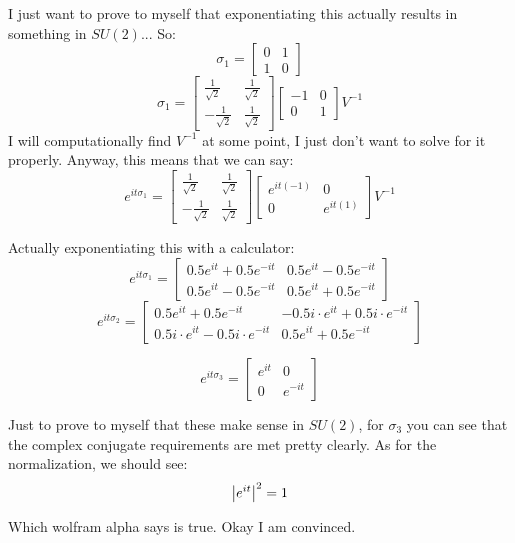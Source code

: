 \documentclass{article}
\begin{document}
I just want to prove to myself that exponentiating this actually results in something in $SU(2)$... So:
\[ \sigma_1 = \begin{bmatrix} 0 & 1 \\ 1 & 0 \end{bmatrix}  \]
\[ \sigma_1 = \begin{bmatrix}
    \frac{1}{\sqrt{2}} & \frac{1}{\sqrt{2}} \\ 
    -\frac{1}{\sqrt{2}} & \frac{1}{\sqrt{2}}
\end{bmatrix}\begin{bmatrix}
    -1 & 0 \\ 0 & 1 
\end{bmatrix}V^{-1}  \]
 I will computationally find $V^{-1}$ at some point, I just don't want to solve for it properly. Anyway, this means that we can say:
 \[ e^{it\sigma_1} = \begin{bmatrix}
    \frac{1}{\sqrt{2}} & \frac{1}{\sqrt{2}} \\ 
    -\frac{1}{\sqrt{2}} & \frac{1}{\sqrt{2}}
\end{bmatrix}\begin{bmatrix}
    e^{it(-1)} & 0 \\ 0 & e^{it(1)} 
\end{bmatrix}V^{-1} \]

Actually exponentiating this with a calculator: 
\[ e^{it\sigma_1} =  \begin{bmatrix}
    0.5e^{it} + 0.5e^{-it} & 0.5e^{it} - 0.5e^{-it} \\
     0.5e^{it} - 0.5e^{-it} & 0.5e^{it} + 0.5e^{-it}
\end{bmatrix} \]
\[ e^{it\sigma_2} = \begin{bmatrix}
    0.5e^{it} + 0.5e^{-it} & -0.5i\cdot e^{it} + 0.5i \cdot e^{-it} \\
     0.5i \cdot e^{it} - 0.5i\cdot e^{-it}  & 0.5e^{it} + 0.5e^{-it}
\end{bmatrix} \]

\[ e^{it\sigma_3} = \begin{bmatrix}
    e^{it} &  0 \\
     0 &  e^{-it}
\end{bmatrix} \]

Just to prove to myself that these make sense in $SU(2)$, for $\sigma_3$ you can see that the complex conjugate requirements are met pretty clearly. As for the normalization, we should see:
\[ \abs{e^{it}}^2 = 1 \]

Which wolfram alpha says is true. Okay I am convinced. 
\end{document}
